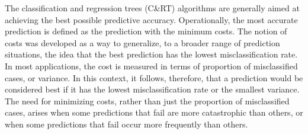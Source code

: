 \documentclass[caret-main.tex]{subfiles}
\begin{document}
The classification and regression trees (C\&RT) algorithms are generally aimed at achieving the best possible predictive accuracy. Operationally, the most accurate prediction is defined as the prediction with the minimum costs. The notion of costs was developed as a way to generalize, to a broader range of prediction situations, the idea that the best prediction has the lowest misclassification rate. In most applications, the cost is measured in terms of proportion of misclassified cases, or variance. In this context, it follows, therefore, that a prediction would be considered best if it has the lowest misclassification rate or the smallest variance. The need for minimizing costs, rather than just the proportion of misclassified cases, arises when some predictions that fail are more catastrophic than others, or when some predictions that fail occur more frequently than others.
\end{document}
